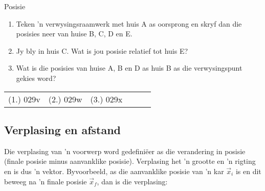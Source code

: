 \begin{exercises}{Posisie}
\begin{enumerate}[noitemsep, label=\textbf{\arabic*}. ]
 
\begin{enumerate}[noitemsep, label=\textbf{\alph*}. ] 
    \item Teken 'n verwysingsraamwerk met huis A as oorsprong en skryf dan die posisies neer van huise B, C, D en E.
    \item Jy bly in huis C. Wat is jou posisie relatief tot huis E?
    \item Wat is die posisies van huise A, B en D as huis B as die verwysingspunt gekies word?
\end{enumerate}
\end{enumerate}

\practiceinfo
 \par \begin{tabular}[h]{cccccc}
 (1.) 029v  &  (2.) 029w  &  (3.) 029x  & \end{tabular}
\end{exercises}

\subsection*{Verplasing en afstand}
    \nopagebreak
{}

Die verplasing van 'n voorwerp word gedefini\"eer as die verandering in posisie (finale posisie minus aanvanklike posisie). Verplasing het 'n grootte en 'n rigting en is dus 'n vektor. Byvoorbeeld, as die aanvanklike posisie van 'n kar $\vec{x}_{i}$ is en dit beweeg na 'n finale posisie $\vec{x}_{f}$, dan is die verplasing:

